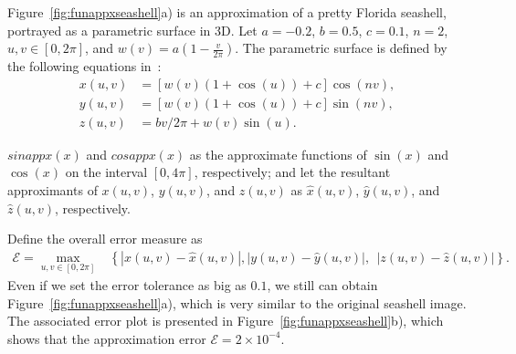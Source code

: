 \begin{exmp}
 
Figure~\ref{fig:funappxseashell}a) is an approximation of a pretty Florida
seashell, portrayed as a parametric surface in 3D. Let $a=-0.2$, $b=0.5$,
$c=0.1$, $n = 2$, $u,v \in [0, 2 \pi]$, and $w(v) =
a\left(1-\frac{v}{2\pi}\right)$. The parametric surface is defined by the
following equations in~\cite{DavEtal05}:
\begin{align*}
x(u,v) & =   \left[ w(v) \left(1+\cos(u)\right) + c\right]\cos(nv),\\
y(u,v) & = \left[w(v) (1+\cos(u)) + c\right] \sin(nv),\\
z(u,v) & = {bv}/{2\pi} + w(v)\sin(u).
\end{align*}
%

$sinappx(x)$ and $cosappx(x)$ as the approximate functions of $\sin(x)$ and
$\cos(x)$ on the interval $[0,4\pi]$, respectively; and let the resultant
approximants of $x(u,v)$, $y(u,v)$, and $z(u,v)$ as $\hat{x}(u,v)$,
$\hat{y}(u,v)$, and $\hat{z}(u,v)$, respectively.

Define the overall error measure as
\begin{align*}
\mathscr{E} =  \max\limits_{u,v \in [0, 2 \pi] } & \left\{   |x(u,v)-\hat{x}(u,v)|,\right.
   \left.  |y(u,v)-\hat{y}(u,v)|, 
                                  \ \    |z(u,v)-\hat{z}(u,v)|\right\}.
\end{align*}
Even if we set the error tolerance as big as $0.1$, we still can obtain
Figure~\ref{fig:funappxseashell}a), which is very similar to the original
seashell image. The associated error plot is presented in
Figure~\ref{fig:funappxseashell}b), which shows that the approximation error
$\mathscr{E}=2 \times 10^{-4}$.
\end{exmp}

